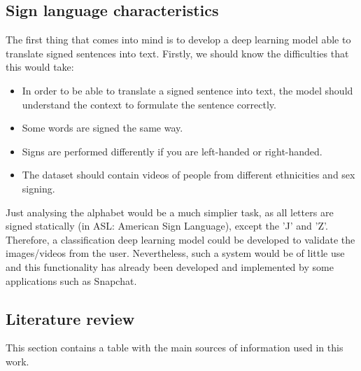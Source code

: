 \subsection{Sign language characteristics}
The first thing that comes into mind is to develop a deep learning model able to translate signed sentences into 
text. Firstly, we should know the difficulties that this would take:
\begin{itemize}[noitemsep]
    \item In order to be able to translate a signed sentence into text, the model should understand the context to formulate the sentence correctly.
    \item Some words are signed the same way.
    \item Signs are performed differently if you are left-handed or right-handed.
    \item The dataset should contain videos of people from different ethnicities and sex signing.
\end{itemize}

Just analysing the alphabet would be a much simplier task, as all letters are signed statically (in ASL: American Sign Language), except the 'J' and 'Z'.
Therefore, a classification deep learning model could be developed to validate the images/videos from the user.
Nevertheless, such a system would be of little use and this functionality has already been developed and implemented by some applications such as Snapchat.

\subsection{Literature review}
This section contains a table with the main sources of information used in this work. \\

